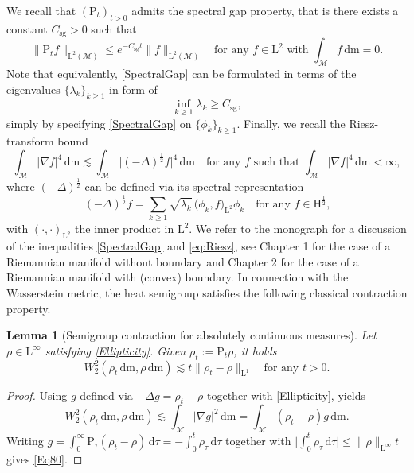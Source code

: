 \documentclass[11pt,a4paper,oneside]{amsart}
\numberwithin{equation}{section}
\newtheorem{lemma}[theorem]{Lemma}
\newcommand{\dd}{\mathrm{d}}
\newcommand{\LL}{\mathrm{L}}
\newcommand{\pp}{\mathrm{P}}
\newcommand{\m}{\mathrm{m}}
\begin{document}
%
\medskip
%

We recall that $(\text{P}_t)_{t>0}$ admits the spectral gap property, that is there exists a constant $C_{\text{sg}}>0$ such that 
%
\begin{equation}\label{SpectralGap}
%
\|\pp_t f\|_{\mathrm{L}^2(\mathcal{M})} \le e^{-C_{\text{sg}} t}\|f\|_{\mathrm{L}^2(\mathcal{M})}\quad\text{for any $f \in \mathrm{L}^2$ with $\int_{\mathcal{M}} f\, \dd \m =0$.}
%
\end{equation}
%
Note that equivalently, \eqref{SpectralGap} can be formulated in terms of the eigenvalues $\{\lambda_k\}_{k\geq 1}$ in form of 
%
\begin{equation}\label{SpectralGapEigenvalues}
%
\inf_{k\geq 1}\lambda_k\geq C_{\text{sg}},
%
\end{equation}
%
simply by specifying \eqref{SpectralGap} on $\{\phi_k\}_{k\geq 1}$. Finally, we recall the Riesz-transform bound
%
\begin{equation}\label{eq:Riesz}
\int_{\mathcal{M}} |\nabla f|^4\,\dd\m  \lesssim \int_{\mathcal{M}}\big|(-\Delta)^\frac12 f\big|^4\,\dd\m\quad\text{for any $f$ such that $\int_{\mathcal{M}}\vert\nabla f\vert^4\,\dd\m<\infty$},
\end{equation}
%
where $(-\Delta)^{\frac{1}{2}}$ can be defined via its spectral representation
%
\begin{equation}\label{Laplacian12}
%
(-\Delta)^{\frac{1}{2}}f=\sum_{k\geq 1} \sqrt{\lambda_k}\,\big(\phi_k,f\big)_{\LL^2}\phi_k\quad\text{for any $f\in \mathrm{H}^{\frac{1}{2}}$,}
%
\end{equation}
%
with $(\cdot,\cdot)_{\LL^2}$ the inner product in $\LL^2$. We refer to the monograph \cite{wangbook} for a discussion of the inequalities \eqref{SpectralGap} and \eqref{eq:Riesz}, see Chapter 1 for the case of a Riemannian manifold without boundary and Chapter 2 for the case of a Riemannian manifold with (convex) boundary. In connection with the Wasserstein metric, the heat semigroup satisfies the following classical contraction property.
\begin{lemma}[Semigroup contraction for absolutely continuous measures]\label{lem:HeatContractionrho}
Let $\rho \in\LL^\infty$ satisfying \eqref{Ellipticity}. Given $\rho_t:=\mathrm{P}_t\rho$, it holds
%
\begin{equation}\label{Eq80}
W_2^2 (\rho_t\,\dd\m, \rho\,\dd\m) \lesssim t \| \rho_t - \rho\|_{\LL^1}\quad\text{for any $t>0$.}
\end{equation}
%
\end{lemma}
\begin{proof}
Using $g$ defined via $-\Delta g=\rho_t-\rho$ together with \eqref{Ellipticity}, \cite[Corollary 4.4]{ambrosio2019finer} yields
%
$$W^2_2(\rho_t\,\dd\m,\rho\,\dd\m)\lesssim \int_{\mathcal{M}}\vert\nabla g\vert^2\,\dd\m=\int_{\mathcal{M}}(\rho_t-\rho)g\,\dd\m.$$
%
Writing $g=\int_{0}^{\infty}\text{P}_\tau(\rho_t-\rho)\,\dd\tau=-\int_{0}^t \rho_\tau\,\dd\tau$ together with $\vert\int_{0}^t \rho_\tau\,\dd\tau\vert\leq \|\rho\|_{\LL^{\infty}} t$ gives \eqref{Eq80}.
%
\end{proof}
\end{document}
